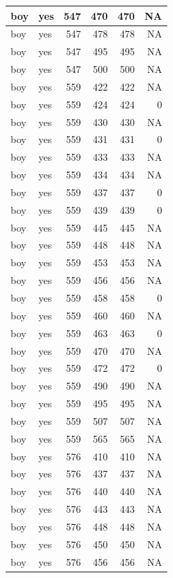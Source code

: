 \documentclass[man]{apa6}
\begin{document}
\begin{tabular}{l|l|r|r|r|r}
\hline
boy & yes & 547 & 470 & 470 & NA\\
\hline
boy & yes & 547 & 478 & 478 & NA\\
\hline
boy & yes & 547 & 495 & 495 & NA\\
\hline
boy & yes & 547 & 500 & 500 & NA\\
\hline
boy & yes & 559 & 422 & 422 & NA\\
\hline
boy & yes & 559 & 424 & 424 & 0\\
\hline
boy & yes & 559 & 430 & 430 & NA\\
\hline
boy & yes & 559 & 431 & 431 & 0\\
\hline
boy & yes & 559 & 433 & 433 & NA\\
\hline
boy & yes & 559 & 434 & 434 & NA\\
\hline
boy & yes & 559 & 437 & 437 & 0\\
\hline
boy & yes & 559 & 439 & 439 & 0\\
\hline
boy & yes & 559 & 445 & 445 & NA\\
\hline
boy & yes & 559 & 448 & 448 & NA\\
\hline
boy & yes & 559 & 453 & 453 & NA\\
\hline
boy & yes & 559 & 456 & 456 & NA\\
\hline
boy & yes & 559 & 458 & 458 & 0\\
\hline
boy & yes & 559 & 460 & 460 & NA\\
\hline
boy & yes & 559 & 463 & 463 & 0\\
\hline
boy & yes & 559 & 470 & 470 & NA\\
\hline
boy & yes & 559 & 472 & 472 & 0\\
\hline
boy & yes & 559 & 490 & 490 & NA\\
\hline
boy & yes & 559 & 495 & 495 & NA\\
\hline
boy & yes & 559 & 507 & 507 & NA\\
\hline
boy & yes & 559 & 565 & 565 & NA\\
\hline
boy & yes & 576 & 410 & 410 & NA\\
\hline
boy & yes & 576 & 437 & 437 & NA\\
\hline
boy & yes & 576 & 440 & 440 & NA\\
\hline
boy & yes & 576 & 443 & 443 & NA\\
\hline
boy & yes & 576 & 448 & 448 & NA\\
\hline
boy & yes & 576 & 450 & 450 & NA\\
\hline
boy & yes & 576 & 456 & 456 & NA\\

\end{tabular}
\end{document}
